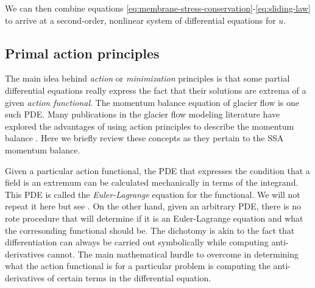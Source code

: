 \documentclass{article}
\theoremstyle{definition}
\theoremstyle{plain}
\begin{document}
We can then combine equations \eqref{eq:membrane-stress-conservation}-\eqref{eq:sliding-law} to arrive at a second-order, nonlinear system of differential equations for $u$.


\subsection{Primal action principles}
\label{sec:primal-action-principles}

The main idea behind \emph{action} or \emph{minimization} principles is that some partial differential equations really express the fact that their solutions are extrema of a given \emph{action functional}.
The momentum balance equation of glacier flow is one such PDE.
Many publications in the glacier flow modeling literature have explored the advantages of using action principles to describe the momentum balance \citep{bassis2010hamilton, dukowicz2010consistent, brinkerhoff2013data, shapero2021icepack}.
Here we briefly review these concepts as they pertain to the SSA momentum balance.

Given a particular action functional, the PDE that expresses the condition that a field is an extremum can be calculated mechanically in terms of the integrand.
This PDE is called the \emph{Euler-Lagrange} equation for the functional.
We will not repeat it here but see \citet{weinstock1974calculus}.
On the other hand, given an arbitrary PDE, there is no rote procedure that will determine if it is an Euler-Lagrange equation and what the corresonding functional should be.
The dichotomy is akin to the fact that differentiation can always be carried out symbolically while computing anti-derivatives cannot.
The main mathematical hurdle to overcome in determining what the action functional is for a particular problem is computing the anti-derivatives of certain terms in the differential equation.
\end{document}
